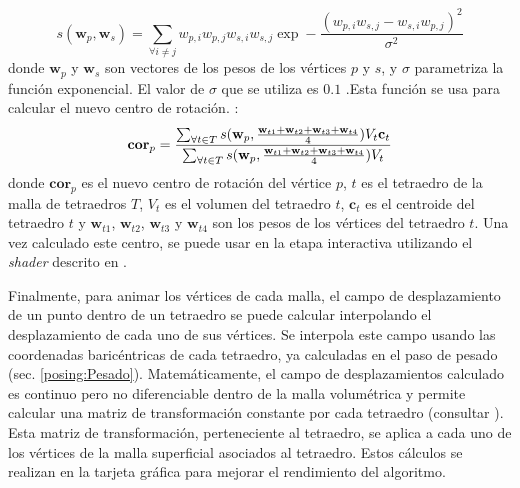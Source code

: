 \begin{equation}
\label{similarity}
 s(\textbf{w}_p,\textbf{w}_s) = 
\sum_{\forall i \neq j} w_{p,i}w_{p,j}w_{s,i}w_{s,j}\exp-\frac{(w_{p,i}w_{s,j}-w_{s,i}w_{p,j})^2}{\sigma^2}
\end{equation}
\normalsize
%
donde $\textbf{w}_p$ y $\textbf{w}_s$ son vectores de los pesos de los vértices $p$ y $s$, y $\sigma$ parametriza la función exponencial. El valor de $\sigma$ que se utiliza es $0.1$ .Esta función se usa para calcular el nuevo centro de rotación. : 
%
\begin{equation}
\textbf{cor}_p = 
\frac
  {
  \sum_{\forall t \in T}
    s(\textbf{w}_p,
      \frac{\textbf{w}_{t1}+\textbf{w}_{t2}+\textbf{w}_{t3}+\textbf{w}_{t4}}{4})
    V_t\mathbf{c}_t
  }
  {
  \sum_{\forall t \in T}
    s(\textbf{w}_p,
      \frac{\textbf{w}_{t1}+\textbf{w}_{t2}+\textbf{w}_{t3}+\textbf{w}_{t4}}{4})
    V_t
  } 
\normalsize
\end{equation}
%
donde $\textbf{cor}_p$ es el nuevo centro de rotación del vértice $p$, $t$ es el tetraedro de la malla de tetraedros $T$, $V_t$ es el volumen del tetraedro $t$, $\textbf{c}_t$ es el centroide del tetraedro $t$ y $\textbf{w}_{t1}$, $\textbf{w}_{t2}$, $\textbf{w}_{t3}$ y $\textbf{w}_{t4}$ son los pesos de los vértices del tetraedro $t$. Una vez calculado este centro, se puede usar en la etapa interactiva utilizando el \emph{shader} descrito en \cite{le2016real}.

Finalmente, para animar los vértices de cada malla, el campo de desplazamiento de un punto dentro de un tetraedro se puede calcular interpolando el desplazamiento de cada uno de sus vértices. Se interpola este campo usando las coordenadas baricéntricas de cada tetraedro, ya calculadas en el paso de pesado (sec. \ref{posing:Pesado}). Matemáticamente, el campo de desplazamientos calculado es continuo pero no diferenciable dentro de la malla volumétrica y permite calcular una matriz de transformación constante por cada tetraedro (consultar \cite{Muller2004}). Esta matriz de transformación, perteneciente al tetraedro, se aplica a cada uno de los vértices de la malla superficial asociados al tetraedro. Estos cálculos se realizan en la tarjeta gráfica para mejorar el rendimiento del algoritmo.

